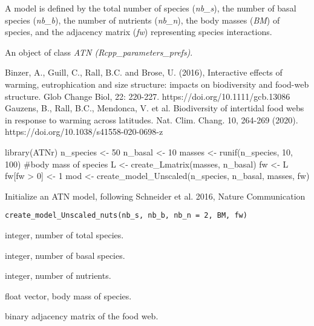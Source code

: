 \documentclass[letterpaper]{book}
\begin{document}
%
\begin{Details}\relax
A model is defined by the total number of species
(\emph{nb\_s}), the number of basal species (\emph{nb\_b}),
the number of nutrients (\emph{nb\_n}), the body masses
(\emph{BM}) of species, and the adjacency matrix (\emph{fw})
representing species interactions.
\end{Details}
%
\begin{Value}
An object of class \emph{ATN (Rcpp\_parameters\_prefs)}.
\end{Value}
%
\begin{References}\relax


Binzer, A., Guill, C., Rall, B.C. and Brose, U. (2016),
Interactive effects of warming, eutrophication and size structure: impacts on biodiversity and food-web structure.
Glob Change Biol, 22: 220-227. https://doi.org/10.1111/gcb.13086
Gauzens, B., Rall, B.C., Mendonca, V. et al.
Biodiversity of intertidal food webs in response to warming across latitudes.
Nat. Clim. Chang. 10, 264-269 (2020). https://doi.org/10.1038/s41558-020-0698-z
\end{References}
%
\begin{Examples}
\begin{ExampleCode}
library(ATNr)
n_species <- 50
n_basal <- 10
masses <- runif(n_species, 10, 100) #body mass of species
L <- create_Lmatrix(masses, n_basal)
fw <- L
fw[fw > 0] <- 1
mod <- create_model_Unscaled(n_species, n_basal, masses, fw)
\end{ExampleCode}
\end{Examples}
%
\begin{Description}\relax
Initialize an ATN model, following Schneider et al. 2016, Nature Communication
\end{Description}
%
\begin{Usage}
\begin{verbatim}
create_model_Unscaled_nuts(nb_s, nb_b, nb_n = 2, BM, fw)
\end{verbatim}
\end{Usage}
%
\begin{Arguments}
\begin{ldescription}
\item[\code{nb\_s}] integer, number of total species.

\item[\code{nb\_b}] integer, number of basal species.

\item[\code{nb\_n}] integer, number of nutrients.

\item[\code{BM}] float vector, body mass of species.

\item[\code{fw}] binary adjacency matrix of the food web.
\end{ldescription}
\end{Arguments}
\end{document}
